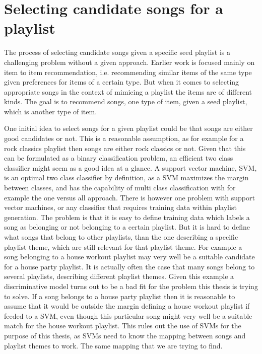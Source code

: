 \documentclass[a4paper,11pt]{kth-mag}
\begin{document}
\section{Selecting candidate songs for a playlist}
The process of selecting candidate songs given a specific seed playlist is a challenging problem without a given approach. Earlier work is focused mainly on item to item recommendation, i.e. recommending similar items of the same type given preferences for items of a certain type. But when it comes to selecting appropriate songs in the context of mimicing a playlist the items are of different kinds. The goal is to recommend songs, one type of item, given a seed playlist, which is another type of item. 

One initial idea to select songs for a given playlist could be that songs are either good candidates or not. This is a reasonable assumption, as for example for a rock classics playlist then songs are either rock classics or not. Given that this can be formulated as a binary classification problem, an efficient two class classifier might seem as a good idea at a glance. A support vector machine, SVM,  is an optimal two class classifier by definition, as a SVM maximizes the margin between classes\cite{cortes1995support}, and has the capability of multi class classification with for example the one versus all approach\cite{hsu2002comparison}. There is however one problem with support vector machines, or any classifier that requires training data within playlist generation. The problem is that it is easy to define training data which labels a song as belonging or not belonging to a certain playlist. But it is hard to define what songs that belong to other playlists, than the one describing a specific playlist theme, which are still relevant for that playlist theme. For example a song belonging to a house workout playlist may very well be a suitable candidate for a house party playlist. It is actually often the case that many songs belong to several playlists, describing different playlist themes. Given this example a discriminative model turns out to be a bad fit for the problem this thesis is trying to solve. If a song belongs to a house party playlist then it is reasonable to assume that it would be outside the margin defining a house workout playlist if feeded to a SVM, even though this particular song might very well be a suitable match for the house workout playlist. This rules out the use of SVMs for the purpose of this thesis, as SVMs need to know the mapping between songs and playlist themes to work. The same mapping that we are trying to find.
\end{document}
